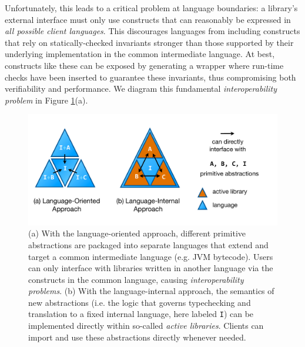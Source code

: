 \documentclass{llncs}
\begin{document}
Unfortunately, this leads to a critical problem at language boundaries: a library's external interface must only use constructs that can reasonably be expressed in \emph{all possible client languages}. This discourages languages from including constructs that rely on statically-checked invariants stronger than those supported by their underlying implementation in the common intermediate language. At best, constructs like these can be exposed by generating a wrapper where run-time checks have been inserted to guarantee these invariants, thus compromising both verifiability and performance.
We diagram this fundamental \emph{interoperability problem} in Figure \ref{approaches}(a). 
\begin{figure}[t]
\vspace{-15px}
\includegraphics[scale=0.415]{approaches.pdf}
\vspace{-30px}
\caption{(a) With the language-oriented approach, different primitive abstractions are packaged into separate languages that extend and target a common intermediate language (e.g. JVM bytecode). Users can only interface with libraries written in another language via the constructs in the common language, causing \emph{interoperability problems}. (b) With the language-internal approach, the semantics of new abstractions (i.e. the logic that governs typechecking and translation to a fixed {internal language}, here labeled \texttt{I}) can be implemented directly within so-called \emph{active libraries}. Clients can import and use these abstractions directly whenever needed.}
\vspace{-10px}
\label{approaches}
\end{figure}
\end{document}
